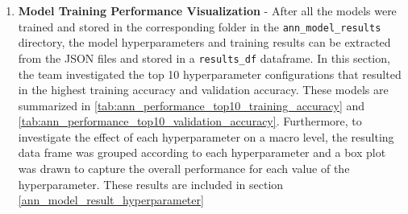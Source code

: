 \documentclass[a4paper]{article}
\begin{document}
\begin{enumerate}
    \item \textbf{Model Training Performance Visualization} - After all the models were trained and stored in the corresponding folder in the \lstinline{ann_model_results} directory, the model hyperparameters and training results can be extracted from the JSON files and stored in a \lstinline{results_df} dataframe. In this section, the team investigated the top 10 hyperparameter configurations that resulted in the highest training accuracy and validation accuracy. These models are summarized in \autoref{tab:ann_performance_top10_training_accuracy} and \autoref{tab:ann_performance_top10_validation_accuracy}. Furthermore, to investigate the effect of each hyperparameter on a macro level, the resulting data frame was grouped according to each hyperparameter and a box plot was drawn to capture the overall performance for each value of the hyperparameter. These results are included in section \ref{ann_model_result_hyperparameter}
\end{enumerate}
\end{document}
